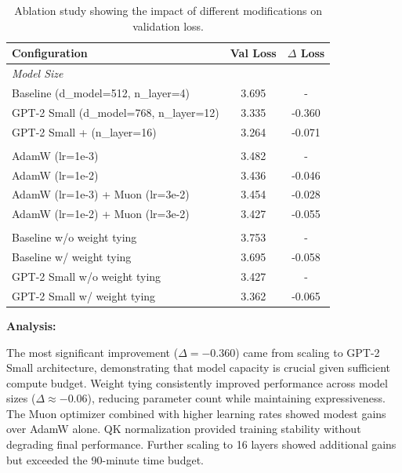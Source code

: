 \begin{answer}
\begin{table}[!htb]
\centering
\caption{Ablation study showing the impact of different modifications on validation loss.}
\label{tab:leaderboard_ablations}
\begin{tabular}{lcc}
\toprule
\textbf{Configuration} & \textbf{Val Loss} & \textbf{$\Delta$ Loss} \\
\midrule
\multicolumn{3}{l}{\textit{Model Size}} \\
\addlinespace[0.5ex]
Baseline (d\_model=512, n\_layer=4) & 3.695 & - \\
GPT-2 Small (d\_model=768, n\_layer=12) & 3.335 & -0.360 \\
GPT-2 Small + (n\_layer=16) & 3.264 & -0.071 \\
\addlinespace[1ex]
\multicolumn{3}{l}{\textit{Optimizer \& Learning Rate (GPT-2 Small)}} \\
\addlinespace[0.5ex]
AdamW (lr=1e-3) & 3.482 & - \\
AdamW (lr=1e-2) & 3.436 & -0.046 \\
AdamW (lr=1e-3) + Muon (lr=3e-2) & 3.454 & -0.028 \\
AdamW (lr=1e-2) + Muon (lr=3e-2) & 3.427 & -0.055 \\
\addlinespace[1ex]
\multicolumn{3}{l}{\textit{Weight Tying}} \\
\addlinespace[0.5ex]
Baseline w/o weight tying & 3.753 & - \\
Baseline w/ weight tying & 3.695 & -0.058 \\
GPT-2 Small w/o weight tying & 3.427 & - \\
GPT-2 Small w/ weight tying & 3.362 & -0.065 \\
\bottomrule
\end{tabular}
\end{table}

\textbf{Analysis:}

The most significant improvement ($\Delta = -0.360$) came from scaling to GPT-2 Small architecture, demonstrating that model capacity is crucial given sufficient compute budget. Weight tying consistently improved performance across model sizes ($\Delta \approx -0.06$), reducing parameter count while maintaining expressiveness. The Muon optimizer combined with higher learning rates showed modest gains over AdamW alone. QK normalization provided training stability without degrading final performance. Further scaling to 16 layers showed additional gains but exceeded the 90-minute time budget.

\end{answer}

